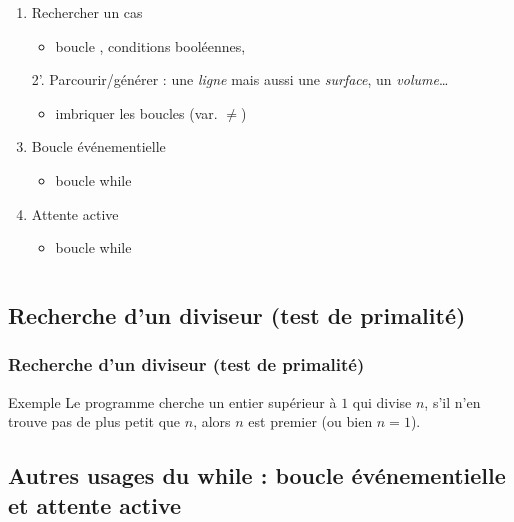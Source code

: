 \documentclass[xcolor=pdftex,svgnames,table]{beamer}
\begin{document}
\begin{frame}
\begin{columns}
\begin{column}[t]{0.59\linewidth}
\begin{enumerate}
\setcounter{enumi}{\value{savedenumi}}
    \item Rechercher un cas\pause
      \begin{itemize}
        \item boucle \alert{}, conditions booléennes, 
      \end{itemize}\pause
    \item[2'.] Parcourir/générer : une \emph{ligne} mais aussi une \emph{surface}, un \emph{volume}\dots\pause
      \begin{itemize}
        \item imbriquer les boucles (var. $\neq$)
      \end{itemize}\pause
    \item Boucle événementielle
  \begin{itemize}
\item boucle \alert{while}
  \end{itemize}\pause
    \item Attente active
  \begin{itemize}
\item boucle \alert{while}
  \end{itemize}
\end{enumerate}
\end{column}
\end{columns}
\end{frame}


\subsection{Recherche d'un diviseur (test de primalité)}

\begin{frame}[fragile]
\frametitle{Recherche d'un diviseur (test de primalité)}

\begin{block}{Exemple}
  Le programme cherche un entier supérieur à $1$ qui divise $n$, s'il n'en trouve pas
 de plus petit que $n$, alors $n$ est premier (ou bien $n = 1$).\nowrite
\end{block}

\end{frame}


\subsection{Autres usages du while : boucle événementielle et attente active}
\end{document}
